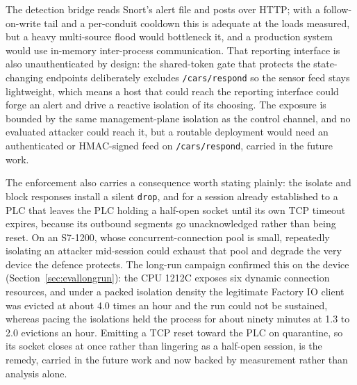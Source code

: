The detection bridge reads Snort's alert file and posts over HTTP; with a follow-on-write tail and a per-conduit cooldown this is adequate at the loads measured, but a heavy multi-source flood would bottleneck it, and a production system would use in-memory inter-process communication. That reporting interface is also unauthenticated by design: the shared-token gate that protects the state-changing endpoints deliberately excludes \texttt{/cars/respond} so the sensor feed stays lightweight, which means a host that could reach the reporting interface could forge an alert and drive a reactive isolation of its choosing. The exposure is bounded by the same management-plane isolation as the control channel, and no evaluated attacker could reach it, but a routable deployment would need an authenticated or HMAC-signed feed on \texttt{/cars/respond}, carried in the future work.

The enforcement also carries a consequence worth stating plainly: the isolate and block responses install a silent \texttt{drop}, and for a session already established to a PLC that leaves the PLC holding a half-open socket until its own TCP timeout expires, because its outbound segments go unacknowledged rather than being reset. On an S7-1200, whose concurrent-connection pool is small, repeatedly isolating an attacker mid-session could exhaust that pool and degrade the very device the defence protects. The long-run campaign confirmed this on the device (Section~\ref{sec:evallongrun}): the CPU 1212C exposes six dynamic connection resources, and under a packed isolation density the legitimate Factory IO client was evicted at about 4.0 times an hour and the run could not be sustained, whereas pacing the isolations held the process for about ninety minutes at 1.3 to 2.0 evictions an hour. Emitting a TCP reset toward the PLC on quarantine, so its socket closes at once rather than lingering as a half-open session, is the remedy, carried in the future work and now backed by measurement rather than analysis alone.

